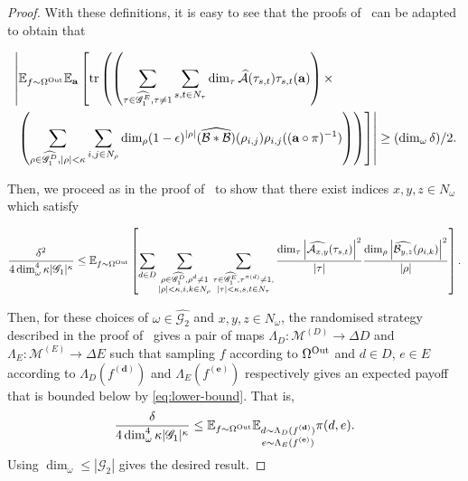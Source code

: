 \documentclass[a4paper,11pt]{article}
\theoremstyle{definition}
\newcommand{\mnn}[1]{\mathscr{#1}}
\newcommand{\tuple}[1]{{\mathbf{#1}}}
\newcommand{\ex}[1]{\mathbb{E}_{#1}}
\newcommand{\gr}{\mathscr{G}}
\newcommand{\ba}{\mathbf{a}}
\newcommand{\tr}{\mathrm{tr}}
\newcommand{\A}{\mathcal{A}}
\newcommand{\B}{\mathcal{B}}
\begin{document}
\begin{proof}
With these definitions, it is easy to see that the proofs of~ can be adapted to obtain that 

\begin{align*}
& \nonumber  \left| \ex{f\sim \Omega^{\textnormal{Out}}} \ex{\ba} \left[ 
     \tr \left(
    \left(
    \sum_{\tau\in \widehat{\gr_1^E}, \tau\neq 1}
    \sum_{s,t\in N_\tau}
\dim_\tau
\widehat{\A}(\tau_{s,t}) \tau_{s,t}(\tuple{a}) \right) \times
\right. \right. \right. 
\\ 
& 
\left. \left. \left.
\left(
\sum_{\rho \in \widehat{\gr_1^D}, |\rho| < \kappa}
\sum_{i,j \in N_\rho}
\dim_\rho (1-\epsilon)^{|\rho|} \widehat{(\B*\B)}(\rho_{i,j}) \rho_{i,j}( (\tuple{a} \circ \pi)^{-1})  \right) \right) \right] \right| \geq (\dim_\omega \delta)/2.
\end{align*}

Then, we proceed as in the proof of~ to show that there exist indices $x,y,z \in N_\omega$ which satisfy

\begin{equation} \label{eq:lower-bound}
    \frac{\delta^2}{4 \dim_\omega^4 \kappa |\gr_1|^\kappa} \leq \ex{f\sim \Omega^{\textnormal{Out}}} \left[ \sum_{d\in D}
\sum_{\substack{\rho\in \widehat{\gr_1^D}, \rho^d \neq 1\\
 |\rho| < \kappa, i,k\in N_\rho}}
 \sum_{\substack{\tau\in \widehat{\gr_1^E}, \tau^{\pi(d)}\neq 1, \\ |\tau|<\kappa, s,t \in N_\tau}}
 \frac{
  \dim_\tau  \left\vert \widehat{\A_{x,y}}(\tau_{s,t})\right\vert^2}{|\tau|}
 \frac{ \dim_\rho  \left\vert
 \widehat{{\B}_{y,z}}(\rho_{i,k})\right\vert^2}{|\rho|}
 \right]. 
\end{equation}


Then, for these choices of $\omega \in \widehat{\gr_2}$ and $x,y,z \in N_\omega$, the randomised strategy described in the proof of~ gives a pair of maps $\Lambda_D: \mnn{M}^{(D)} \to \Delta D$ and $\Lambda_E: \mnn{M}^{(E)} \to \Delta E$ such that 
sampling $f$ according to $ \Omega^{\textnormal{Out}}$ and $d \in D$, $e\in E$ according to $\Lambda_D(f^{(\mathbf{d})})$ and $\Lambda_E(f^{(\mathbf{e})})$ respectively gives an expected payoff that is bounded below by \eqref{eq:lower-bound}. That is,
\begin{equation*}
 \frac{\delta}{4 \dim_\omega^4 \kappa |\gr_1|^\kappa} \leq  \ex{f\sim \Omega^{\textnormal{Out}}} \ex{\substack{d \sim \Lambda_D(f^{(\mathbf{d})})\\e\sim \Lambda_E(f^{(\mathbf{e})})}} \pi(d,e).
\end{equation*} Using $\dim_\omega \leq |\gr_2|$ gives the desired result.
\end{proof}
\end{document}
